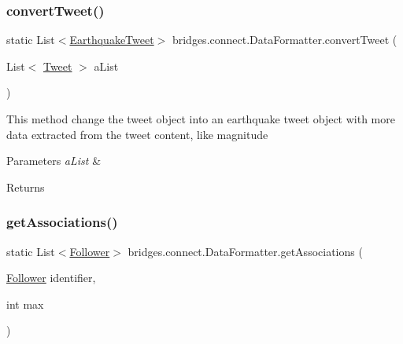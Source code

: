 \subsubsection{\texorpdfstring{convert\+Tweet()}{convertTweet()}}
{\footnotesize\ttfamily static List$<$\hyperlink{classbridges_1_1data__src__dependent_1_1_earthquake_tweet}{Earthquake\+Tweet}$>$ bridges.\+connect.\+Data\+Formatter.\+convert\+Tweet (\begin{DoxyParamCaption}\item[{List$<$ \hyperlink{classbridges_1_1data__src__dependent_1_1_tweet}{Tweet} $>$}]{a\+List }\end{DoxyParamCaption})\hspace{0.3cm}{\ttfamily [static]}}

This method change the tweet object into an earthquake tweet object with more data extracted from the tweet content, like magnitude 
\begin{DoxyParams}{Parameters}
{\em a\+List} & \\
\hline
\end{DoxyParams}
\begin{DoxyReturn}{Returns}

\end{DoxyReturn}
\hypertarget{classbridges_1_1connect_1_1_data_formatter_a3877fbdef4320f03dba7f2a6832adfbb}{}\label{classbridges_1_1connect_1_1_data_formatter_a3877fbdef4320f03dba7f2a6832adfbb} 
\subsubsection{\texorpdfstring{get\+Associations()}{getAssociations()}\hspace{0.1cm}{\footnotesize\ttfamily [1/5]}}
{\footnotesize\ttfamily static List$<$\hyperlink{classbridges_1_1data__src__dependent_1_1_follower}{Follower}$>$ bridges.\+connect.\+Data\+Formatter.\+get\+Associations (\begin{DoxyParamCaption}\item[{\hyperlink{classbridges_1_1data__src__dependent_1_1_follower}{Follower}}]{identifier,  }\item[{int}]{max }\end{DoxyParamCaption})\hspace{0.3cm}{\ttfamily [static]}}

